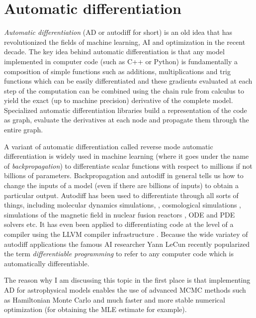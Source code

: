 \documentclass[12pt,dvipsnames]{report}
\newcommand{\ssf}[1]{\textsf{#1}}
\begin{document}
\section{Automatic differentiation}
\label{sec:autodiff}
\textsl{Automatic differentiation} (AD or autodiff for short)\citep{10.1145/355586.364791} is an old idea 
that has revolutionized the fields of machine learning, AI and optimization in the 
recent decade. 
The key idea behind automatic differentiation 
is that any model implemented in computer code (such as \ssf{C++} or 
\ssf{Python}) is fundamentally a composition 
of simple functions such as additions, multiplications and trig functions 
which can be easily differentiated and these gradients evaluated at each step 
of the computation can be combined using the chain rule from calculus to 
yield the exact (up to machine precision) derivative of the complete model.
Specialized automatic differentiation libraries build a representation of the 
code as graph, evaluate the derivatives at each node and propagate them through 
the entire graph. 

A variant of automatic differentiation called reverse mode automatic differentiation 
is widely used in machine learning (where it goes under the name of 
\emph{backpropagation}) to differentiate scalar functions with respect to 
millions if not billions of parameters. 
Backpropagation and autodiff in general tells us how to change the inputs of a 
model (even if there are billions of inputs) to obtain a particular output.
Autodiff has been used to differentiate through all sorts of things, including 
molecular dynamics simulations, \citep{arXiv:1912.04232}, cosmological simulations 
\citep{2016MNRAS.463.2273F}, simulations of the magnetic field in nuclear fusion 
reactors \citep{arXiv:2009.00196}, ODE and PDE solvers etc. It has even been 
applied to differentiating code at 
 the level of a compiler using the LLVM compiler infrastructure \citep{arXiv:2010.01709}.
 Because the wide variatey of autodiff applications
the famous AI researcher Yann LeCun recently popularized the term 
\textsl{differentiable programming} to refer to any computer code which is 
automatically differentiable.

The reason why I am discussing this topic in the first place is that implementing AD 
for astrophysical models enables the use  of advanced MCMC methods such as 
Hamiltonian Monte Carlo and much faster and more stable numerical optimization  
(for obtaining the MLE estimate for example).
\end{document}
